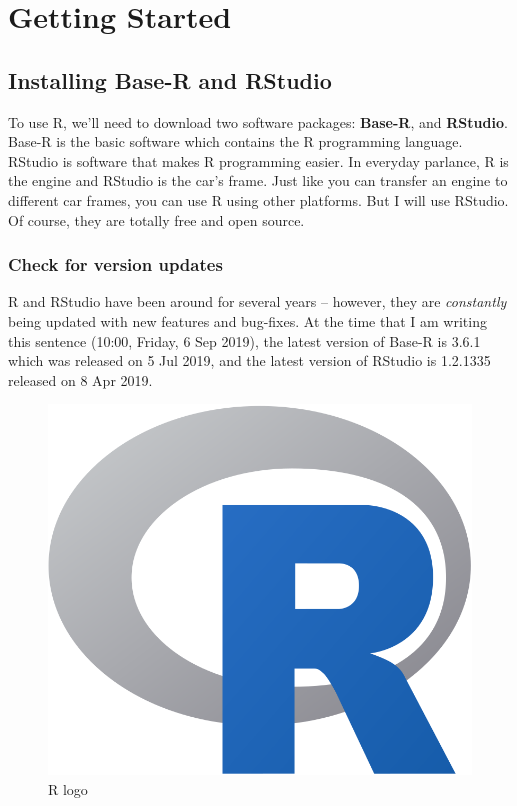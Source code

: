 \documentclass[
]{book}
\begin{document}
\hypertarget{started}{%
\chapter{Getting Started}\label{started}}

\hypertarget{installing-base-r-and-rstudio}{%
\section{Installing Base-R and RStudio}\label{installing-base-r-and-rstudio}}

To use R, we'll need to download two software packages: \textbf{Base-R}, and \textbf{RStudio}. Base-R is the basic software which contains the R programming language. RStudio is software that makes R programming easier. In everyday parlance, R is the engine and RStudio is the car's frame. Just like you can transfer an engine to different car frames, you can use R using other platforms. But I will use RStudio. Of course, they are totally free and open source.

\hypertarget{check-for-version-updates}{%
\subsection{Check for version updates}\label{check-for-version-updates}}

R and RStudio have been around for several years -- however, they are \emph{constantly} being updated with new features and bug-fixes. At the time that I am writing this sentence (10:00, Friday, 6 Sep 2019), the latest version of Base-R is 3.6.1 which was released on 5 Jul 2019, and the latest version of RStudio is 1.2.1335 released on 8 Apr 2019.

\begin{figure}

{\centering \includegraphics[width=0.4\linewidth]{images/rlogo} 

}

\caption{R logo}\label{fig:rlogo}
\end{figure}
\end{document}
